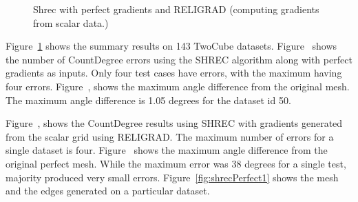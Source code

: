\begin{figure}[ht] 
	\centering
	\caption{Shrec with perfect gradients and RELIGRAD (computing gradients from scalar data.) }
	\label{fig:shrecTwoCube}
	\vskip-0.2cm
\end{figure}
Figure~\ref{fig:shrecTwoCube} shows the summary results on 143 TwoCube datasets. Figure~\protect{} shows the number of CountDegree errors using the SHREC algorithm along with perfect gradients as inputs. Only four test cases have errors, with the maximum having four errors. 
Figure~\protect{}, shows the maximum angle difference from the original mesh. The maximum angle difference is 1.05 degrees for the dataset id 50.

Figure~\protect{}, shows the CountDegree results using SHREC with gradients generated from the scalar grid using RELIGRAD. The maximum number of errors for a single dataset is four. Figure~\protect{} shows the maximum angle difference from the original perfect mesh. While the maximum error was 38 degrees for a single test, majority produced very small errors. Figure~\ref{fig:shrecPerfect1} shows the mesh and the edges generated on a particular dataset.

